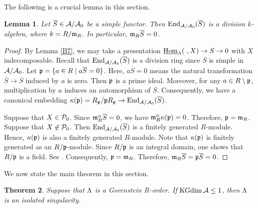 \documentclass[11pt]{amsart}
\newtheorem{theorem}{Theorem}[section]
\newtheorem{lemma}[theorem]{Lemma}
\theoremstyle{definition}
\numberwithin{equation}{section}
\begin{document}
The following is a crucial lemma in this section. 

\begin{lemma}\label{B9}
Let $\overline{S} \in \AA / \AA_0$ be a simple functor. 
Then $\End _{\AA / \AA_0} (\overline{S})$ is a division $k$-algebra, where $k=R/\m_R$. 
In particular, $\m_R \overline{S} = 0$.  
\end{lemma}


\begin{proof}
By Lemma \ref{B7}, we may take a presentation $\sHomL (\ ,X) \to S\to 0$ with $X$ indecomposable.
Recall that $\End_{\AA / \AA_0} (\overline{S})$ is a division ring since $\overline{S}$ is simple in $\AA / \AA_0$. 
Let $\p = \{ a \in R \mid a\overline{S}=0\}$. 
Here, $a\overline{S}=0$ means the natural transformation $\overline{S} \to \overline{S}$ induced by $a$ is zero.  
Then $\p$ is a prime ideal. 
Moreover, for any $a \in R \setminus \p$, multiplication by $a$ induces an automorphism of $\overline{S}$. 
Consequently, we have a canonical embedding $\kappa (\p )= R_{\p}/\p R_{\p} \to \End_{\AA / \AA_0} (\overline{S})$.

Suppose that $X \in \PP_0$. 
Since $\m_R ^n \overline{S}=0$, we have $\m_R ^n \kappa (\p )=0$. 
Therefore, $\p = \m_R$.
Suppose that $X \not\in \PP_0$. 
Then $\End_{\AA / \AA_0} (\overline{S})$ is a finitely generated $R$-module. 
Hence, $\kappa (\p )$ is also a finitely generated $R$-module. 
Note that $\kappa (\p )$ is finitely generated as an $R/ \p$-module. 
Since $R/ \p$ is an integral domain, one shows that $R/ \p$ is a field. 
See \cite[Proposition 5.7]{AM}. 
Consequently, $\p =\m_R$.  
Therefore, $\m_R \overline{S} = \p \overline{S} = 0$. 
\end{proof}


We now state the main theorem in this section. 


\begin{theorem}\label{B10}
Suppose that $\LL$ is a Gorenstein $R$-order. 
If $\KGdim \AA \le 1$, then $\LL$ is an isolated singularity. 
\end{theorem}
\end{document}
